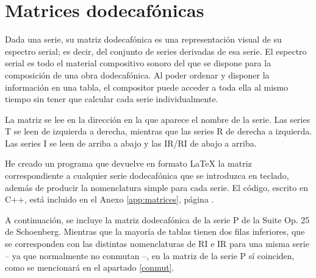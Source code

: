	\section{Matrices dodecafónicas}
		
		Dada una serie, su matriz dodecafónica es una representación visual de su espectro serial; es decir, del conjunto de series derivadas de esa serie. El espectro serial es todo el material compositivo sonoro del que se dispone para la composición de una obra dodecafónica. Al poder ordenar y disponer la información en una tabla, el compositor puede acceder a toda ella al mismo tiempo sin tener que calcular cada serie individualmente.		
		
		La matriz se lee en la dirección en la que aparece el nombre de la serie. Las series T se leen de izquierda a derecha, mientras que las series R de derecha a izquierda. Las series I se leen de arriba a abajo y las IR/RI de abajo a arriba.
		
		He creado un programa que devuelve en formato \LaTeX{} la matriz correspondiente a cualquier serie dodecafónica que se introduzca en teclado, además de producir la nomenclatura simple para cada serie. El código, escrito en C++, está incluido en el Anexo \ref{app:matrices}, página \pageref{app:matrices}.
		
		A continuación, se incluye la matriz dodecafónica de la serie P de la Suite Op. 25 de Schoenberg. Mientras que la mayoría de tablas tienen dos filas inferiores, que se corresponden con las distintas nomenclaturas de RI e IR para una misma serie – ya que normalmente no conmutan –, en la matriz de la serie P sí coinciden, como se mencionará en el apartado \ref{conmut}.
		
